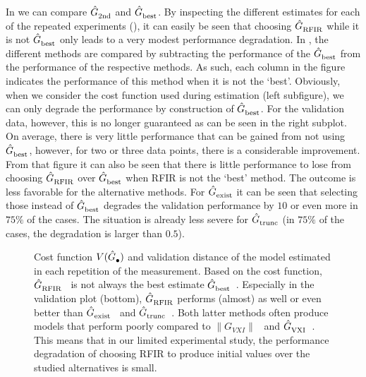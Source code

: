 In  we can compare $\hat{G}_{\mathrm{2nd}}^{\mathrm{}}$ and $\hat{G}_{\mathrm{best}}^{\mathrm{}}$.
By inspecting the different estimates for  each of the repeated experiments (), it can easily be seen that choosing $\hat{G}_{\mathrm{RFIR}}^{\mathrm{}}$ while it is not $\hat{G}_{\mathrm{best}}^{\mathrm{}}$ only leads to a very modest performance degradation.
In , the different methods are compared by subtracting the performance of the $\hat{G}_{\mathrm{best}}^{\mathrm{}}$ from the performance of the respective methods.
As such, each column in the figure indicates the performance of this method when it is not the `best'.
Obviously, when we consider the cost function used during estimation (left subfigure), we can only degrade the performance by construction of $\hat{G}_{\mathrm{best}}^{\mathrm{}}$.
For the validation data, however, this is no longer guaranteed as can be seen in the right subplot.
On average, there is very little performance that can be gained from not using $\hat{G}_{\mathrm{best}}^{\mathrm{}}$, however, for two or three data points, there is a considerable improvement.
From that figure it can also be seen that there is little performance to lose from choosing $\hat{G}_{\mathrm{RFIR}}^{\mathrm{}}$ over $\hat{G}_{\mathrm{best}}^{\mathrm{}}$ when RFIR is not the `best' method.
The outcome is less favorable for the alternative methods.
For $\hat{G}_{\mathrm{exist}}^{\mathrm{}}$ it can be seen that selecting those instead of $\hat{G}_{\mathrm{best}}^{\mathrm{}}$  degrades the validation performance by $10$ or even more in $75\%$ of the cases.
The situation is already less severe for $\hat{G}_{\mathrm{trunc}}^{\mathrm{}}$ (in $75\%$ of the cases, the degradation is larger than $0.5$).

\begin{figure}
  \centering
  \setlength{\figurewidth}{0.85\columnwidth}
  \setlength{\figureheight}{0.68\figurewidth}
  
  \caption[$\costFunc{\bullet}$ and $\validationDistance{\bullet}$ for each repeated measurement.]{Cost function $V(\hat{G}_{\mathrm{\bullet}}^{\mathrm{}})$ and validation distance of the model estimated in each repetition of the measurement.
  Based on the cost function, $\hat{G}_{\mathrm{RFIR}}^{\mathrm{}}$~ is not always the best estimate $\hat{G}_{\mathrm{best}}^{\mathrm{}}$~.
  Especially in the validation plot (bottom), $\hat{G}_{\mathrm{RFIR}}^{\mathrm{}}$ performs (almost) as well or even better than $\hat{G}_{\mathrm{exist}}^{\mathrm{}}$~ and $\hat{G}_{\mathrm{trunc}}^{\mathrm{}}$~.
  Both latter methods often produce models that perform poorly compared to $\| G_{VXI} \|$~ and $\hat{G}_{\mathrm{VXI}}^{\mathrm{}}$~.
  This means that in our limited experimental study, the performance degradation of choosing RFIR to produce initial values over the studied alternatives is small.}
  \label{fig:overview}
\end{figure}

